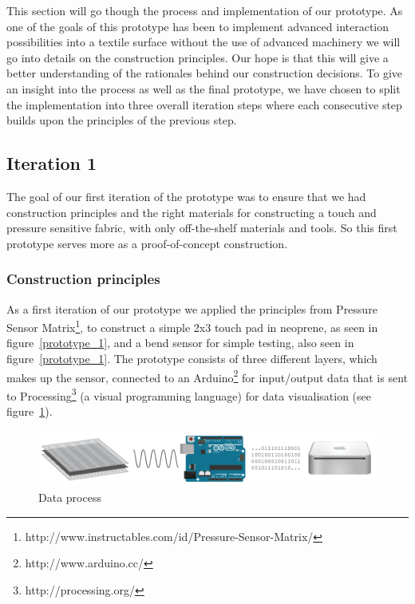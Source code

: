 This section will go though the process and implementation of our prototype.
As one of the goals of this prototype has been to implement advanced interaction possibilities into a textile surface without the use of advanced machinery we will go into details on the construction principles.
Our hope is that this will give a better understanding of the rationales behind our construction decisions.
To give an insight into the process as well as the final prototype, we have chosen to split the implementation into three overall iteration steps where each consecutive step builds upon the principles of the previous step.

\subsection{Iteration 1}
\label{ch:textiletouch:it1}
The goal of our first iteration of the prototype was to ensure that we had construction principles and the right materials for constructing a touch and pressure sensitive fabric, with only off-the-shelf materials and tools.
So this first prototype serves more as a proof-of-concept construction.

\subsubsection{Construction principles}
As a first iteration of our prototype we applied the principles from Pressure Sensor Matrix\footnote{http://www.instructables.com/id/Pressure-Sensor-Matrix/}, to construct a simple 2x3 touch pad in neoprene, as seen in figure~\ref{prototype_1}, and a bend sensor for simple testing, also seen in figure~\ref{prototype_1}.
The prototype consists of three different layers, which makes up the sensor, connected to an Arduino\footnote{http://www.arduino.cc/} for input/output data that is sent to Processing\footnote{http://processing.org/} (a visual programming language) for data visualisation (see figure~\ref{data-process}).

\begin{figure}[h]
  \centering
  \includegraphics[width=0.9\linewidth]{figures/touch/process}
  \caption{Data process}
   \label{data-process}
\end{figure}

